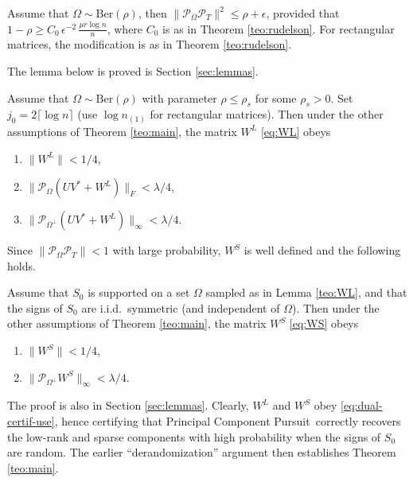 \begin{corollary}
  \label{teo:POPT}
  Assume that $\Omega \sim \text{Ber}(\rho)$, then $\|\mathcal{P}_{\Omega}\mathcal{P}_T\|^2 \le \rho + \epsilon$, provided that $1-\rho \ge C_0 \, \epsilon^{-2} \,
  \frac{\mu r \log n}{n}$, where $C_0$ is as in Theorem
  \ref{teo:rudelson}.  For rectangular matrices, the modification is as in Theorem \ref{teo:rudelson}.
\end{corollary}

The lemma below is proved is Section \ref{sec:lemmas}.

\begin{lemma}
  \label{teo:WL}
  Assume that $\Omega \sim \text{Ber}(\rho)$ with parameter $\rho \le
  \rho_s$ for some $\rho_s > 0$. Set $j_0 = 2\lceil \log n \rceil$ (use
  $\log n_{(1)}$ for rectangular matrices). Then under the other assumptions of Theorem \ref{teo:main}, the matrix $W^L$
  \eqref{eq:WL} obeys
\begin{enumerate}
\item[(a)] $\|W^L\| < 1/4$,
\item[(b)] $\|\mathcal{P}_{\Omega}(UV^* +  W^L)\|_F < \lambda/4$,
\item[(c)] $\|\mathcal{P}_{\Omega^\perp}(UV^* + W^L)\|_\infty < \lambda/4$.
\end{enumerate}
\end{lemma}

Since $\|\mathcal{P}_{\Omega}\mathcal{P}_T\| < 1$ with large probability, $W^S$ is well defined and the following holds.

\begin{lemma}
  \label{teo:WS}
  Assume that $S_0$ is supported on a set $\Omega$ sampled as in Lemma
  \ref{teo:WL}, and that the signs of $S_0$ are i.i.d.~symmetric (and independent of $\Omega$).  Then under the other assumptions of Theorem \ref{teo:main}, the matrix $W^S$ \eqref{eq:WS} obeys
\begin{enumerate}
\item[(a)] $\|W^S\| < 1/4$,
\item[(b)] $\|\mathcal{P}_{\Omega^\perp} W^S\|_\infty < \lambda/4$.
\end{enumerate}
\end{lemma}

The proof is also in Section \ref{sec:lemmas}.  Clearly, $W^L$ and $W^S$ obey \eqref{eq:dual-certif-use}, hence certifying that Principal Component Pursuit\, correctly recovers the low-rank and sparse components with high probability when the signs of $S_0$ are random. The earlier ``derandomization'' argument then establishes Theorem \ref{teo:main}.

